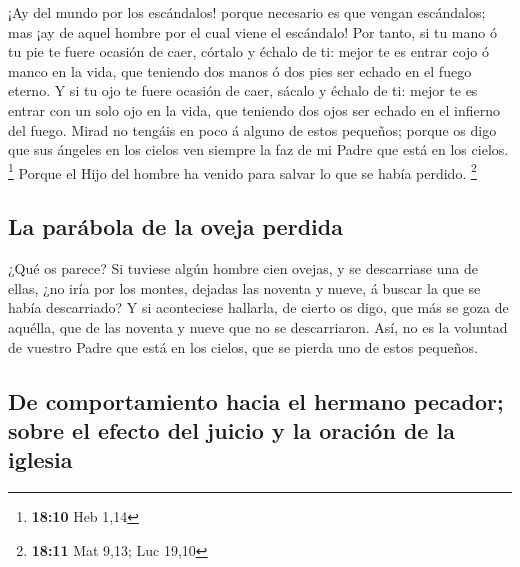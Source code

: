  ¡Ay del mundo por los escándalos! porque necesario es que
vengan escándalos; mas ¡ay de aquel hombre por el cual viene el
escándalo!  Por tanto, si tu mano ó tu pie te fuere
ocasión de caer, córtalo y échalo de ti: mejor te es entrar cojo ó manco
en la vida, que teniendo dos manos ó dos pies ser echado en el fuego
eterno.  Y si tu ojo te fuere ocasión de caer, sácalo y
échalo de ti: mejor te es entrar con un solo ojo en la vida, que
teniendo dos ojos ser echado en el infierno del fuego. 
Mirad no tengáis en poco á alguno de estos pequeños; porque os digo que
sus ángeles en los cielos ven siempre la faz de mi Padre que está en los
cielos. \footnote{\textbf{18:10} Heb 1,14}  Porque el
Hijo del hombre ha venido para salvar lo que se había perdido.
\footnote{\textbf{18:11} Mat 9,13; Luc 19,10}

\hypertarget{la-paruxe1bola-de-la-oveja-perdida}{%
\subsection{La parábola de la oveja
perdida}\label{la-paruxe1bola-de-la-oveja-perdida}}

 ¿Qué os parece? Si tuviese algún hombre cien ovejas, y
se descarriase una de ellas, ¿no iría por los montes, dejadas las
noventa y nueve, á buscar la que se había descarriado?  Y
si aconteciese hallarla, de cierto os digo, que más se goza de aquélla,
que de las noventa y nueve que no se descarriaron.  Así,
no es la voluntad de vuestro Padre que está en los cielos, que se pierda
uno de estos pequeños.

\hypertarget{de-comportamiento-hacia-el-hermano-pecador-sobre-el-efecto-del-juicio-y-la-oraciuxf3n-de-la-iglesia}{%
\subsection{De comportamiento hacia el hermano pecador; sobre el efecto
del juicio y la oración de la
iglesia}\label{de-comportamiento-hacia-el-hermano-pecador-sobre-el-efecto-del-juicio-y-la-oraciuxf3n-de-la-iglesia}}

